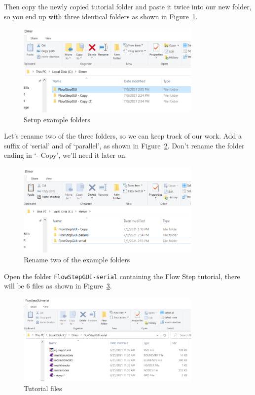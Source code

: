Then copy the newly copied tutorial folder and paste it twice into our new folder, so you end up with three identical folders as shown in Figure~\ref{fg:folders}.

\begin{figure}[H]
\centering
\includegraphics[width=0.8\textwidth]{serial-10}
\caption{Setup example folders}\label{fg:folders}
\end{figure}

\newpage

Let's rename two of the three folders, so we can keep track of our work.  Add a suffix of `serial' and of `parallel', as shown in Figure~\ref{fg:folders-rename}.  Don't rename the folder ending in `- Copy', we'll need it later on.

\begin{figure}[H]
\centering
\includegraphics[width=0.8\textwidth]{serial-11}
\caption{Rename two of the example folders}\label{fg:folders-rename}
\end{figure}

Open the folder \texttt{FlowStepGUI-serial} containing the Flow Step tutorial, there will be 6 files as shown in Figure~\ref{fg:folders-orig}.

\begin{figure}[H]
\centering
\includegraphics[width=0.8\textwidth]{serial-12}
\caption{Tutorial files}\label{fg:folders-orig}
\end{figure}

